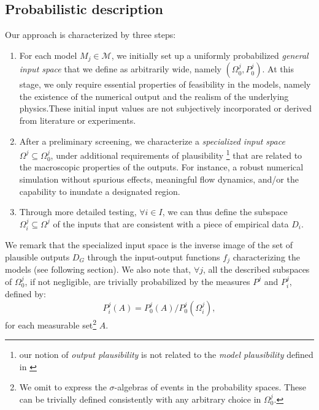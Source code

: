 \documentclass[nhess, manuscript]{copernicus}
\begin{document}
\subsection{Probabilistic description}
Our approach is characterized by three steps:
\begin{enumerate}
\item For each model $M_j\in\mathcal M$, we initially set up a uniformly probabilized \emph{general input space} that we define as arbitrarily wide, namely $(\Omega^j_0, P^j_0)$. At this stage, we only require essential properties of feasibility in the models, namely the existence of the numerical output and the realism of the underlying physics.These initial input values are not subjectively incorporated or derived from literature or experiments.
\item After a preliminary screening, we  characterize a \emph{specialized input space} $\Omega^j\subseteq\Omega^j_0$, under additional requirements of plausibility \footnote{our notion of \emph{output plausibility} is not related to the \emph{model plausibility} defined in \citep{Farrell2015}} that are related to the macroscopic properties of the outputs. For instance, a robust numerical simulation without spurious effects, meaningful flow dynamics, and/or the capability to inundate a designated region.
\item Through more detailed testing, $\forall i\in I$, we can thus define the subspace $\Omega^j_i\subseteq\Omega^j$ of the inputs that are consistent with a piece of empirical data $D_i$.
\end{enumerate}
We remark that the specialized input space is the inverse image of the set of plausible outputs $D_G$ through the input-output functions $f_j$ characterizing the models (see following section). We also note that, $\forall j$, all the described subspaces of $\Omega^j_0$, if not negligible, are trivially probabilized by the measures $P^j$ and $P^j_i$, defined by:
$$P_i^j(A)=P_0^j(A)/P^j_0(\Omega^j_i),$$
for each measurable set\footnote{We omit to express the $\sigma$-algebras of events in the probability spaces. These can be trivially defined consistently with any arbitrary choice in $\Omega^j_0$.} $A$.
\end{document}
